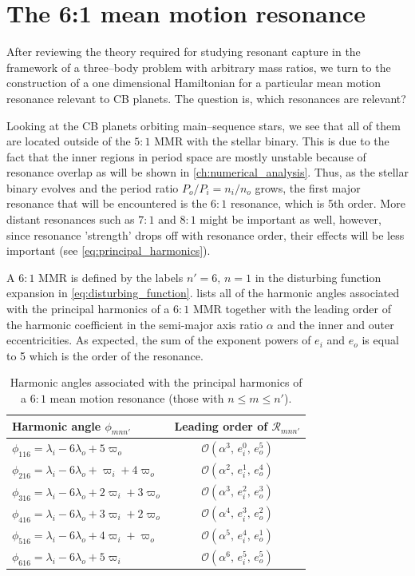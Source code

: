 \documentclass[ twoside,openright,titlepage,numbers=noenddot,headinclude,%
                footinclude=true,cleardoublepage=empty,abstractoff, %
                BCOR=5mm,paper=a4,fontsize=11pt,%
                american,%
                ]{scrreprt}
\begin{document}
\section{The 6:1 mean motion resonance}
\label{sec:6_by_1_resonance}
After reviewing the theory required for studying
resonant capture in the framework of a three--body problem
with arbitrary mass ratios, we turn to the construction of
a one dimensional Hamiltonian for a particular mean motion 
resonance relevant to CB planets. The question is,
which resonances are relevant?

Looking at the CB planets orbiting main--sequence stars,
we see that all of them are located outside of the $5:1$ MMR
with the stellar binary. This is due to the fact that the inner
regions in period space are  mostly unstable because of resonance overlap
as will be shown in \cref{ch:numerical_analysis}. Thus, as the 
stellar binary evolves and the period ratio $P_o/P_i=n_i/n_o$ grows,
the first major resonance that will be encountered is the $6:1$ resonance,
which is 5th order.
More distant resonances such as $7:1$ and $8:1$ might be important
as well, however, since resonance 'strength' drops off with resonance
order, their effects will be less important (see \cref{eq:principal_harmonics}). 


A $6:1$ MMR is defined by the labels $n'=6,\,n=1$ in the disturbing
function expansion in \cref{eq:disturbing_function}. 
lists all of the harmonic angles associated with the principal
harmonics of a $6:1$ MMR together with the leading order of the
harmonic coefficient in the semi-major axis ratio $\alpha$ and
the inner and outer eccentricities. As expected, the sum of the
exponent powers of $e_i$ and $e_o$ is equal to 5 which is the order
of the resonance.
\begin{table}[h!]
\centering
\begin{tabular}{l c}
\toprule
    Harmonic angle $\phi_{mnn'}$ & Leading order of $\mathcal{R}_{mnn'}$\\
\midrule
    $\phi_{116}=\lambda_i-6\lambda_o+5\varpi_o$ & 
    $\mathcal{O}(\alpha^3,\,e_i^0,\,e_o^5)$\\
$\phi_{216}=\lambda_i-6\lambda_o+\varpi_i + 4\varpi_o$ & 
    $\mathcal{O}(\alpha^2,\,e_i^1,\,e_o^4)$\\
$\phi_{316}=\lambda_i-6\lambda_o+2\varpi_i + 3\varpi_o$ & 
    $\mathcal{O}(\alpha^3,\,e_i^2,\,e_o^3)$\\
$\phi_{416}=\lambda_i-6\lambda_o+3\varpi_i + 2\varpi_o$ & 
    $\mathcal{O}(\alpha^4,\,e_i^3,\,e_o^2)$\\
$\phi_{516}=\lambda_i-6\lambda_o+4\varpi_i + \varpi_o$ & 
    $\mathcal{O}(\alpha^5,\,e_i^4,\,e_o^1)$\\
$\phi_{616}=\lambda_i-6\lambda_o+5\varpi_i  $ & 
    $\mathcal{O}(\alpha^6,\,e_i^5,\,e_o^5)$\\
\bottomrule
\end{tabular}
\caption{Harmonic angles associated with the principal harmonics
    of a $6:1$ mean motion resonance (those with $n\leq m\leq n'$).}
\label{tab:6_1_angles}
\end{table}
\end{document}
